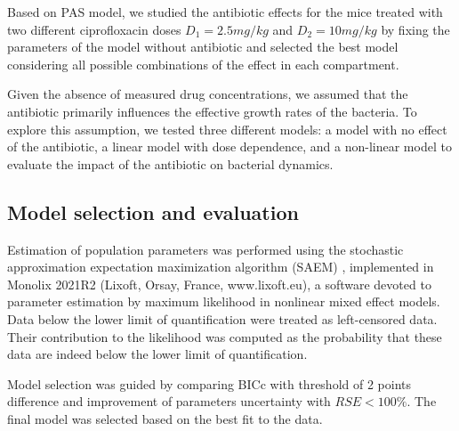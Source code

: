 \documentclass{article}
\begin{document}
Based on PAS model, we studied the antibiotic effects for the mice treated with two different ciprofloxacin doses $D_1 = 2.5 mg/kg $ and $D_2 = 10 mg/kg$ by fixing the parameters of the model without antibiotic and selected the best model considering all possible combinations of the effect in each compartment.





 Given the absence of measured drug concentrations, we assumed that the antibiotic primarily influences the effective growth rates of the bacteria. To explore this assumption, we tested three different models: a model with no effect of the antibiotic, a linear model with dose dependence, and a non-linear model to evaluate the impact of the antibiotic on bacterial dynamics.



%





\subsection{Model selection and evaluation}

Estimation of population parameters was performed using the stochastic approximation expectation maximization algorithm (SAEM) \cite{kuhn2005maximum}, implemented in Monolix 2021R2 (Lixoft, Orsay, France, www.lixoft.eu), a software devoted to parameter estimation by maximum likelihood in nonlinear mixed effect models. Data below the lower limit of quantification were treated as left-censored data. Their contribution to the likelihood was computed as the probability that these data are indeed below the lower limit of quantification\cite{samson2006extension}. 

Model selection was guided by comparing BICc with threshold of 2 points difference and improvement of parameters uncertainty with $RSE < 100\%$. The final model was selected based on the best fit to the data. 
\end{document}
